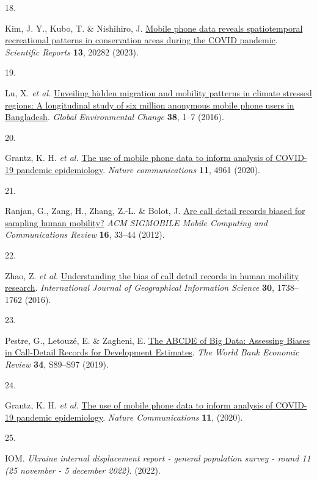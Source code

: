 \documentclass[
  11pt,
]{article}
\newlength{\cslhangindent}
\newlength{\csllabelwidth}
\newenvironment{CSLReferences}[2] %
 {\begin{list}{}{%
  \setlength{\itemindent}{0pt}
  \setlength{\leftmargin}{0pt}
  \setlength{\parsep}{0pt}
  \ifodd #1
   \setlength{\leftmargin}{\cslhangindent}
   \setlength{\itemindent}{-1\cslhangindent}
  \fi
  \setlength{\itemsep}{#2\baselineskip}}}
 {\end{list}}
\newcommand{\CSLLeftMargin}[1]{\parbox[t]{\csllabelwidth}{\strut#1\strut}}
\newcommand{\CSLRightInline}[1]{\parbox[t]{\linewidth - \csllabelwidth}{\strut#1\strut}}
\begin{document}
\begin{CSLReferences}{0}{0}
\CSLLeftMargin{18. }%
\CSLRightInline{Kim, J. Y., Kubo, T. \& Nishihiro, J.
\href{https://doi.org/10.1038/s41598-023-47326-y}{Mobile phone data
reveals spatiotemporal recreational patterns in conservation areas
during the {COVID} pandemic}. \emph{Scientific Reports} \textbf{13},
20282 (2023).}

\CSLLeftMargin{19. }%
\CSLRightInline{Lu, X. \emph{et al.}
\href{https://doi.org/10.1016/j.gloenvcha.2016.02.002}{Unveiling hidden
migration and mobility patterns in climate stressed regions: {A}
longitudinal study of six million anonymous mobile phone users in
{Bangladesh}}. \emph{Global Environmental Change} \textbf{38}, 1--7
(2016).}

\CSLLeftMargin{20. }%
\CSLRightInline{Grantz, K. H. \emph{et al.}
\href{https://doi.org/10.1038/s41467-020-18190-5}{The use of mobile
phone data to inform analysis of {COVID-19} pandemic epidemiology}.
\emph{Nature communications} \textbf{11}, 4961 (2020).}

\CSLLeftMargin{21. }%
\CSLRightInline{Ranjan, G., Zang, H., Zhang, Z.-L. \& Bolot, J.
\href{https://doi.org/10.1145/2412096.2412101}{Are call detail records
biased for sampling human mobility?} \emph{ACM SIGMOBILE Mobile
Computing and Communications Review} \textbf{16}, 33--44 (2012).}

\CSLLeftMargin{22. }%
\CSLRightInline{Zhao, Z. \emph{et al.}
\href{https://doi.org/10.1080/13658816.2015.1137298}{Understanding the
bias of call detail records in human mobility research}.
\emph{International Journal of Geographical Information Science}
\textbf{30}, 1738--1762 (2016).}

\CSLLeftMargin{23. }%
\CSLRightInline{Pestre, G., Letouzé, E. \& Zagheni, E.
\href{https://doi.org/10.1093/wber/lhz039}{The ABCDE of Big Data:
Assessing Biases in Call-Detail Records for Development Estimates}.
\emph{The World Bank Economic Review} \textbf{34}, S89--S97 (2019).}

\CSLLeftMargin{24. }%
\CSLRightInline{Grantz, K. H. \emph{et al.}
\href{https://doi.org/10.1038/s41467-020-18190-5}{The use of mobile
phone data to inform analysis of COVID-19 pandemic epidemiology}.
\emph{Nature Communications} \textbf{11}, (2020).}

\CSLLeftMargin{25. }%
\CSLRightInline{IOM. \emph{Ukraine internal displacement report -
general population survey - round 11 (25 november - 5 december 2022)}.
(2022).}


\end{CSLReferences}
\end{document}
